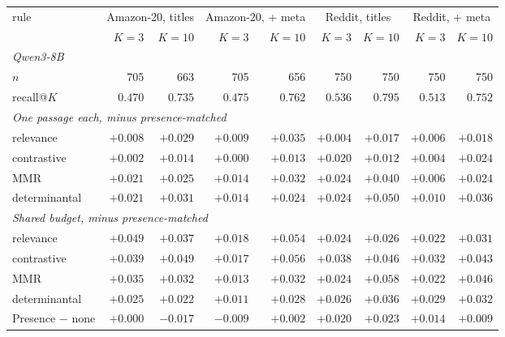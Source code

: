 \begin{tabular}{lrrrrrrrr}
\toprule
rule & \multicolumn{2}{c}{Amazon-20, titles} & \multicolumn{2}{c}{Amazon-20, + meta} & \multicolumn{2}{c}{Reddit, titles} & \multicolumn{2}{c}{Reddit, + meta} \\
 & $K=3$ & $K=10$ & $K=3$ & $K=10$ & $K=3$ & $K=10$ & $K=3$ & $K=10$ \\
\midrule\multicolumn{9}{l}{\emph{Qwen3-8B}} \\
$n$ & 705 & 663 & 705 & 656 & 750 & 750 & 750 & 750 \\
recall@$K$ & $0.470$ & $0.735$ & $0.475$ & $0.762$ & $0.536$ & $0.795$ & $0.513$ & $0.752$ \\
\midrule\multicolumn{9}{l}{\emph{One passage each, minus presence-matched}} \\
relevance & $+0.008$ & $\mathit{+0.029}$ & $+0.009$ & $\mathbf{+0.035}$ & $+0.004$ & $+0.017$ & $+0.006$ & $+0.018$ \\
contrastive & $+0.002$ & $+0.014$ & $+0.000$ & $+0.013$ & $\mathit{+0.020}$ & $+0.012$ & $+0.004$ & $\mathit{+0.024}$ \\
MMR & $\mathit{+0.021}$ & $\mathit{+0.025}$ & $\mathit{+0.014}$ & $\mathbf{+0.032}$ & $\mathit{+0.024}$ & $\mathbf{+0.040}$ & $+0.006$ & $\mathit{+0.024}$ \\
determinantal & $\mathit{+0.021}$ & $\mathit{+0.031}$ & $\mathit{+0.014}$ & $\mathit{+0.024}$ & $\mathit{+0.024}$ & $\mathbf{+0.050}$ & $+0.010$ & $\mathbf{+0.036}$ \\
\midrule\multicolumn{9}{l}{\emph{Shared budget, minus presence-matched}} \\
relevance & $\mathbf{+0.049}$ & $\mathbf{+0.037}$ & $\mathit{+0.018}$ & $\mathbf{+0.054}$ & $\mathit{+0.024}$ & $+0.026$ & $\mathit{+0.022}$ & $\mathit{+0.031}$ \\
contrastive & $\mathbf{+0.039}$ & $\mathbf{+0.049}$ & $+0.017$ & $\mathbf{+0.056}$ & $\mathbf{+0.038}$ & $\mathbf{+0.046}$ & $\mathbf{+0.032}$ & $\mathbf{+0.043}$ \\
MMR & $\mathbf{+0.035}$ & $\mathit{+0.032}$ & $+0.013$ & $\mathbf{+0.032}$ & $\mathit{+0.024}$ & $\mathbf{+0.058}$ & $\mathit{+0.022}$ & $\mathbf{+0.046}$ \\
determinantal & $\mathit{+0.025}$ & $+0.022$ & $+0.011$ & $\mathit{+0.028}$ & $\mathit{+0.026}$ & $\mathbf{+0.036}$ & $\mathbf{+0.029}$ & $\mathbf{+0.032}$ \\
Presence $-$ none & $+0.000$ & $-0.017$ & $-0.009$ & $+0.002$ & $\mathit{+0.020}$ & $\mathit{+0.023}$ & $\mathit{+0.014}$ & $+0.009$ \\

\end{tabular}
